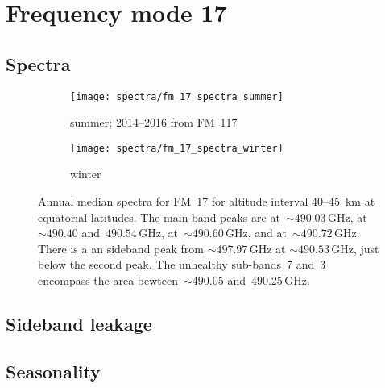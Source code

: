 \section{Frequency mode 17}
\label{FM17}

\subsection{Spectra}
\label{FM17:spectra}

\begin{figure}[ht]
    \centering
    \begin{subfigure}[b]{0.9545\textwidth}
        \texttt{[image: spectra/fm\_17\_spectra\_summer]}
        \caption{summer; 2014--2016 from FM~117}\label{fig:spectra:17:summer}
    \end{subfigure}
    \begin{subfigure}[b]{0.9545\textwidth}
        \texttt{[image: spectra/fm\_17\_spectra\_winter]}
        \caption{winter}\label{fig:spectra:17:winter}
    \end{subfigure}
    \caption{Annual median spectra for FM~17 for altitude interval 40--45~km
        at equatorial latitudes.  The main band peaks are 
        at~$\sim490.03\,\mathrm{GHz}$, 
        at~$\sim490.40$ and~$490.54\,\mathrm{GHz}$, 
        at~$\sim490.60\,\mathrm{GHz}$, and 
        at~$\sim490.72\,\mathrm{GHz}$.  There is a an  sideband peak
        from $\sim497.97\,\mathrm{GHz}$ at $\sim490.53\,\mathrm{GHz}$, just
        below the second  peak.  The unhealthy sub-bands~7 and~3
        encompass the area bewteen~$\sim490.05$ and~$490.25\,\mathrm{GHz}$.
        }\label{fig:spectra:17}
\end{figure}

\noindent
{}

\subsection{Sideband leakage}
\label{FM17:sbl}

\subsection{Seasonality}
\label{FM17:seasonailty}
